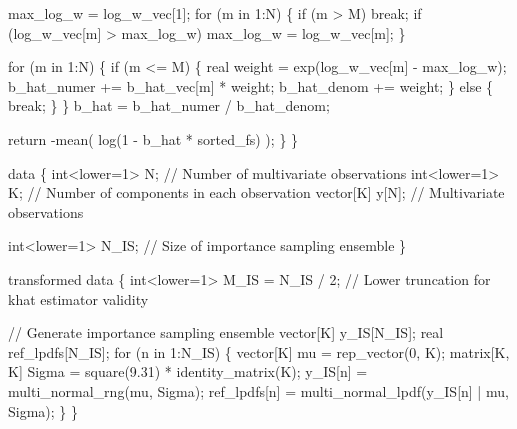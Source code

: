 \documentclass[
  letterpaper,
  DIV=11,
  numbers=noendperiod]{scrartcl}
\newenvironment{Shaded}{\begin{snugshade}}{\end{snugshade}}
\newcommand{\CommentTok}[1]{\textcolor[rgb]{0.37,0.37,0.37}{#1}}
\newcommand{\ControlFlowTok}[1]{\textcolor[rgb]{0.00,0.23,0.31}{#1}}
\newcommand{\DataTypeTok}[1]{\textcolor[rgb]{0.68,0.00,0.00}{#1}}
\newcommand{\DecValTok}[1]{\textcolor[rgb]{0.68,0.00,0.00}{#1}}
\newcommand{\FloatTok}[1]{\textcolor[rgb]{0.68,0.00,0.00}{#1}}
\newcommand{\KeywordTok}[1]{\textcolor[rgb]{0.00,0.23,0.31}{#1}}
\newcommand{\NormalTok}[1]{\textcolor[rgb]{0.00,0.23,0.31}{#1}}
\begin{document}
\begin{codelisting}
\begin{Shaded}
\begin{Highlighting}[]
\NormalTok{    max\_log\_w = log\_w\_vec[}\DecValTok{1}\NormalTok{];}
    \ControlFlowTok{for}\NormalTok{ (m }\ControlFlowTok{in} \DecValTok{1}\NormalTok{:N) \{}
      \ControlFlowTok{if}\NormalTok{ (m \textgreater{} M) }\ControlFlowTok{break}\NormalTok{;}
      \ControlFlowTok{if}\NormalTok{ (log\_w\_vec[m] \textgreater{} max\_log\_w) max\_log\_w = log\_w\_vec[m];}
\NormalTok{    \}}

    \ControlFlowTok{for}\NormalTok{ (m }\ControlFlowTok{in} \DecValTok{1}\NormalTok{:N) \{}
      \ControlFlowTok{if}\NormalTok{ (m \textless{}= M) \{}
        \DataTypeTok{real}\NormalTok{ weight = exp(log\_w\_vec[m] {-} max\_log\_w);}
\NormalTok{        b\_hat\_numer += b\_hat\_vec[m] * weight;}
\NormalTok{        b\_hat\_denom += weight;}
\NormalTok{      \} }\ControlFlowTok{else}\NormalTok{ \{}
        \ControlFlowTok{break}\NormalTok{;}
\NormalTok{      \}}
\NormalTok{    \}}
\NormalTok{    b\_hat = b\_hat\_numer / b\_hat\_denom;}

    \ControlFlowTok{return}\NormalTok{ {-}mean( log(}\DecValTok{1}\NormalTok{ {-} b\_hat * sorted\_fs) );}
\NormalTok{  \}}
\NormalTok{\}}

\KeywordTok{data}\NormalTok{ \{}
  \DataTypeTok{int}\NormalTok{\textless{}}\KeywordTok{lower}\NormalTok{=}\DecValTok{1}\NormalTok{\textgreater{} N; }\CommentTok{// Number of multivariate observations}
  \DataTypeTok{int}\NormalTok{\textless{}}\KeywordTok{lower}\NormalTok{=}\DecValTok{1}\NormalTok{\textgreater{} K; }\CommentTok{// Number of components in each observation}
  \DataTypeTok{vector}\NormalTok{[K] y[N]; }\CommentTok{// Multivariate observations}

  \DataTypeTok{int}\NormalTok{\textless{}}\KeywordTok{lower}\NormalTok{=}\DecValTok{1}\NormalTok{\textgreater{} N\_IS; }\CommentTok{// Size of importance sampling ensemble}
\NormalTok{\}}

\KeywordTok{transformed data}\NormalTok{ \{}
  \DataTypeTok{int}\NormalTok{\textless{}}\KeywordTok{lower}\NormalTok{=}\DecValTok{1}\NormalTok{\textgreater{} M\_IS = N\_IS / }\DecValTok{2}\NormalTok{; }\CommentTok{// Lower truncation for khat estimator validity}

  \CommentTok{// Generate importance sampling ensemble}
  \DataTypeTok{vector}\NormalTok{[K] y\_IS[N\_IS];}
  \DataTypeTok{real}\NormalTok{ ref\_lpdfs[N\_IS];}
  \ControlFlowTok{for}\NormalTok{ (n }\ControlFlowTok{in} \DecValTok{1}\NormalTok{:N\_IS) \{}
    \DataTypeTok{vector}\NormalTok{[K] mu = rep\_vector(}\DecValTok{0}\NormalTok{, K);}
    \DataTypeTok{matrix}\NormalTok{[K, K] Sigma = square(}\FloatTok{9.31}\NormalTok{) * identity\_matrix(K);}
\NormalTok{    y\_IS[n] = multi\_normal\_rng(mu, Sigma);}
\NormalTok{    ref\_lpdfs[n] = multi\_normal\_lpdf(y\_IS[n] | mu, Sigma);}
\NormalTok{  \}}
\NormalTok{\}}


\end{Highlighting}
\end{Shaded}
\end{codelisting}
\end{document}
